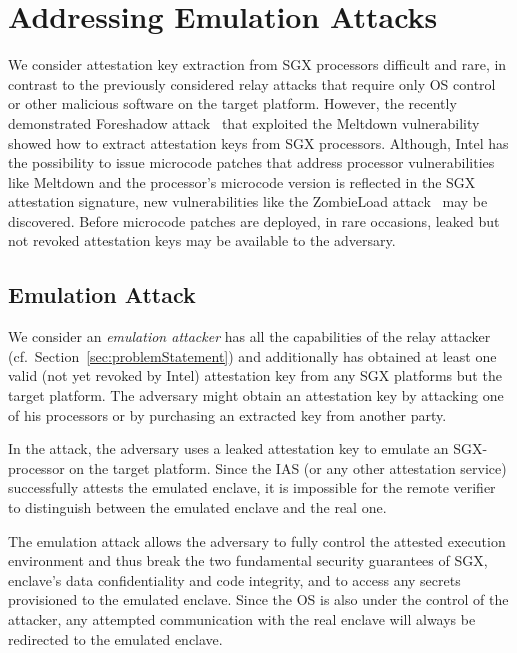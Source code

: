 
\section{Addressing Emulation Attacks}
\label{sec:variantII}

We consider attestation key extraction from SGX processors difficult and rare, in contrast to the previously considered relay attacks that require only OS control or other malicious software on the target platform. However, the recently demonstrated Foreshadow attack~\cite{foreshadow-usenix18} that exploited the Meltdown vulnerability~\cite{Lipp2018meltdown} showed how to extract attestation keys from SGX processors. Although, Intel has the possibility to issue microcode patches that address processor vulnerabilities like Meltdown and the processor's microcode version is reflected in the SGX attestation signature, new vulnerabilities like the ZombieLoad attack~\cite{ZombieLoad} may be discovered. Before microcode patches are deployed, in rare occasions, leaked but not revoked attestation keys may be available to the adversary.


\subsection{Emulation Attack} 

 We consider an \emph{emulation attacker} has all the capabilities of the relay attacker (cf.\ Section~\ref{sec:problemStatement}) and additionally has obtained at least one valid (not yet revoked by Intel) attestation key from any SGX platforms but the target platform. The adversary might obtain an attestation key by attacking one of his processors or by purchasing an extracted key from another party. 

 In the attack, the adversary uses a leaked attestation key to emulate an SGX-processor on the target platform. Since the IAS (or any other attestation service) successfully attests the emulated enclave, it is impossible for the remote verifier to distinguish between the emulated enclave and the real one. 


 The emulation attack allows the adversary to fully control the attested execution environment and thus break the two fundamental security guarantees of SGX, enclave's data confidentiality and code integrity, and to access any secrets provisioned to the emulated enclave. Since the OS is also under the control of the attacker, any attempted communication with the real enclave will always be redirected to the emulated enclave.



